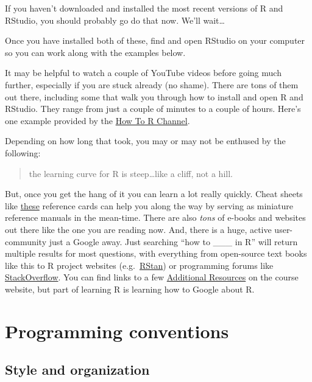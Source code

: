\documentclass[
]{book}
\begin{document}
If you haven't downloaded and installed the most recent versions of R and RStudio, you should probably go do that now. We'll wait\ldots{}

Once you have installed both of these, find and open RStudio on your computer so you can work along with the examples below.

It may be helpful to watch a couple of YouTube videos before going much further, especially if you are stuck already (no shame). There are tons of them out there, including some that walk you through how to install and open R and RStudio. They range from just a couple of minutes to a couple of hours. Here's one example provided by the \href{https://www.youtube.com/watch?v=lVKMsaWju8w}{How To R Channel}.

Depending on how long that took, you may or may not be enthused by the following:

\begin{quote}
the learning curve for R is steep\ldots like a cliff, not a hill.
\end{quote}

But, once you get the hang of it you can learn a lot really quickly. Cheat sheets like \href{https://www.rstudio.com/resources/cheatsheets/}{these} reference cards can help you along the way by serving as miniature reference manuals in the mean-time. There are also \emph{tons} of e-books and websites out there like the one you are reading now. And, there is a huge, active user-community just a Google away. Just searching ``how to \_\_\_ in R'' will return multiple results for most questions, with everything from open-source text books like this to R project websites (e.g.~\href{https://mc-stan.org/users/interfaces/rstan}{RStan}) or programming forums like \href{https://stackoverflow.com/questions/tagged/r}{StackOverflow}. You can find links to a few \href{https://danstich.github.io/stich/classes/BIOL217/resources.html}{Additional Resources} on the course website, but part of learning R is learning how to Google about R.

\hypertarget{programming-conventions}{%
\section{Programming conventions}\label{programming-conventions}}

\hypertarget{style}{%
\subsection*{Style and organization}\label{style}}
\end{document}
